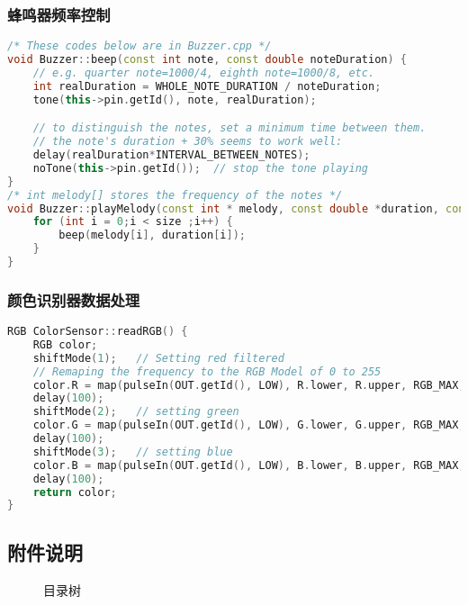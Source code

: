 \documentclass[a4paper,12pt]{ctexart}
\begin{document}
			\subsubsection{蜂鸣器频率控制}
				\begin{lstlisting}[language=C++]
/* These codes below are in Buzzer.cpp */
void Buzzer::beep(const int note, const double noteDuration) {
	// e.g.	quarter note=1000/4, eighth note=1000/8, etc.
	int realDuration = WHOLE_NOTE_DURATION / noteDuration;
	tone(this->pin.getId(), note, realDuration);

	// to distinguish the notes, set a minimum time between them.
	// the note's duration + 30% seems to work well:
	delay(realDuration*INTERVAL_BETWEEN_NOTES);
	noTone(this->pin.getId());	// stop the tone playing
}
/* int melody[] stores the frequency of the notes */
void Buzzer::playMelody(const int * melody, const double *duration, const int size) {
	for (int i = 0;i < size ;i++) {
		beep(melody[i], duration[i]);
	}
}
				\end{lstlisting}
			\subsubsection{颜色识别器数据处理}
				\begin{lstlisting}[language=C++]
RGB ColorSensor::readRGB() {
	RGB color;
	shiftMode(1);	// Setting red filtered
	// Remaping the frequency to the RGB Model of 0 to 255
	color.R = map(pulseIn(OUT.getId(), LOW), R.lower, R.upper, RGB_MAX, 0);
	delay(100);
	shiftMode(2);	// setting green
	color.G = map(pulseIn(OUT.getId(), LOW), G.lower, G.upper, RGB_MAX, 0);
	delay(100);
	shiftMode(3);	// setting blue
	color.B = map(pulseIn(OUT.getId(), LOW), B.lower, B.upper, RGB_MAX, 0);
	delay(100);
	return color;
}
				\end{lstlisting}
		\subsection{附件说明}
			\begin{figure}[!ht]
			\caption{目录树}\label{dirtree}
			\end{figure}
	\clearpage
\end{document}
